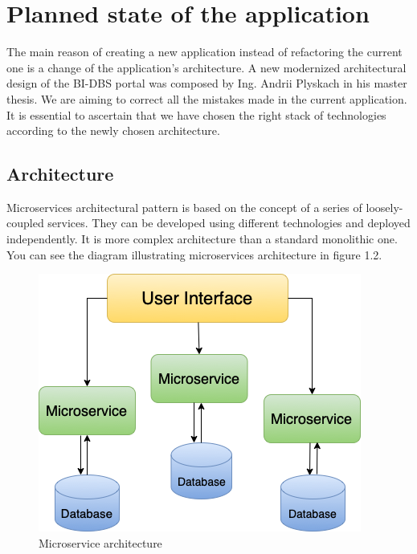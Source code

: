 \section{Planned state of the application} The main reason of creating a new application instead of refactoring the current one is a change of the application's architecture. A new modernized architectural design of the BI-DBS portal was composed by Ing. Andrii Plyskach in his master thesis\cite{mt-plyskach}. We are aiming to correct all the mistakes made in the current application. It is essential to ascertain that we have chosen the right stack of technologies according to the newly chosen architecture.

\subsection{Architecture}
Microservices architectural pattern\cite{architecture-haris} is based on the concept of a series of loosely-coupled services. They can be developed using different technologies and deployed independently. It is more complex architecture than a standard monolithic one. You can see the diagram illustrating microservices architecture in figure 1.2. 

\begin{figure}[hp]
\centering
\includegraphics[scale=0.67]{../png/microservices.png}
\caption{Microservice architecture}\label{picture:mvp}
\end{figure}


